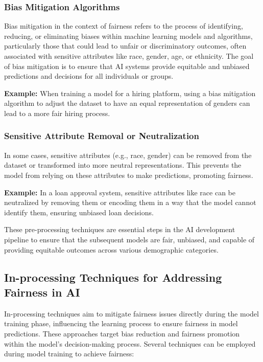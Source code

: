 \documentclass[12pt,a4paper,openright,twoside]{book}
\begin{document}
\subsubsection{Bias Mitigation Algorithms}
Bias mitigation in the context of fairness refers to the process of identifying, reducing, or eliminating biases within machine learning models and algorithms, particularly those that could lead to unfair or discriminatory outcomes, often associated with sensitive attributes like race, gender, age, or ethnicity. The goal of bias mitigation is to ensure that AI systems provide equitable and unbiased predictions and decisions for all individuals or groups.

\textbf{Example:} When training a model for a hiring platform, using a bias mitigation algorithm to adjust the dataset to have an equal representation of genders can lead to a more fair hiring process.

\subsubsection{Sensitive Attribute Removal or Neutralization}
In some cases, sensitive attributes (e.g., race, gender) can be removed from the dataset or transformed into more neutral representations. This prevents the model from relying on these attributes to make predictions, promoting fairness. \cite{NEURIPS2021_64ff7983}

\textbf{Example:} In a loan approval system, sensitive attributes like race can be neutralized by removing them or encoding them in a way that the model cannot identify them, ensuring unbiased loan decisions.


These pre-processing techniques are essential steps in the AI development pipeline to ensure that the subsequent models are fair, unbiased, and capable of providing equitable outcomes across various demographic categories.

\subsection{In-processing Techniques for Addressing Fairness in AI}

In-processing techniques aim to mitigate fairness issues directly during the model training phase, influencing the learning process to ensure fairness in model predictions. These approaches target bias reduction and fairness promotion within the model's decision-making process. Several techniques can be employed during model training to achieve fairness:
\end{document}
